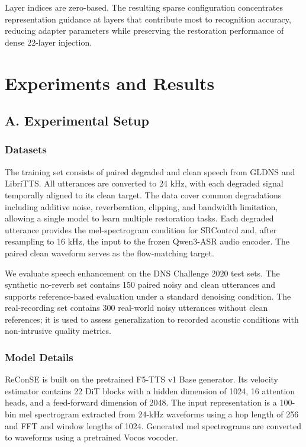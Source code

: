 \documentclass{article}
\begin{document}
Layer indices are zero-based. The resulting sparse configuration concentrates representation guidance at layers that contribute most to recognition accuracy, reducing adapter parameters while preserving the restoration performance of dense 22-layer injection.

\section{Experiments and Results}

\subsection{A. Experimental Setup}

\subsubsection{Datasets}

The training set consists of paired degraded and clean speech from GLDNS and LibriTTS. All utterances are converted to 24 kHz, with each degraded signal temporally aligned to its clean target. The data cover common degradations including additive noise, reverberation, clipping, and bandwidth limitation, allowing a single model to learn multiple restoration tasks. Each degraded utterance provides the mel-spectrogram condition for SRControl and, after resampling to 16 kHz, the input to the frozen Qwen3-ASR audio encoder. The paired clean waveform serves as the flow-matching target.

We evaluate speech enhancement on the DNS Challenge 2020 test sets. The synthetic no-reverb set contains 150 paired noisy and clean utterances and supports reference-based evaluation under a standard denoising condition. The real-recording set contains 300 real-world noisy utterances without clean references; it is used to assess generalization to recorded acoustic conditions with non-intrusive quality metrics.

\subsubsection{Model Details}

ReConSE is built on the pretrained F5-TTS v1 Base generator. Its velocity estimator contains 22 DiT blocks with a hidden dimension of 1024, 16 attention heads, and a feed-forward dimension of 2048. The input representation is a 100-bin mel spectrogram extracted from 24-kHz waveforms using a hop length of 256 and FFT and window lengths of 1024. Generated mel spectrograms are converted to waveforms using a pretrained Vocos vocoder.
\end{document}
